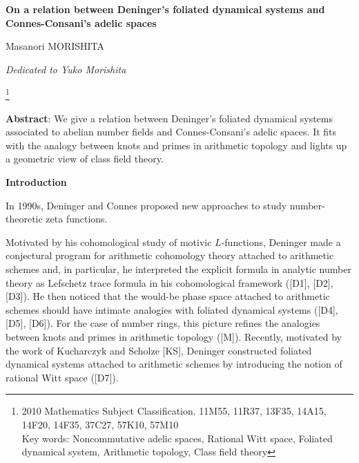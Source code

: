 \documentclass[12pt, leqno]{article}
\begin{document}
\begin{center}
 {\large \bf  On a relation between Deninger's foliated dynamical systems and  Connes-Consani's adelic spaces}
 \end{center}
 
 \vspace{0.08cm}

\begin{center}

Masanori MORISHITA

\end{center}

\begin{center}

{\it Dedicated to Yuko Morishita}

\end{center}

\vspace{0.08cm}

\footnote[0]{2010 Mathematics Subject Classification. 11M55, 11R37, 13F35, 14A15, 14F20, 14F35, 37C27, 57K10, 57M10\\
Key words: Noncommutative adelic spaces, Rational Witt space, Foliated dynamical system,  Arithmetic topology, Class field theory}

{\small {\bf Abstract}:  We give a relation between  Deninger's foliated dynamical systems associated to abelian number fields and  Connes-Consani's adelic spaces. It fits with the analogy 
between knots and primes in arithmetic topology and lights up  a geometric view of class field theory.}

\vspace{0.8cm}

\begin{center}
{\bf Introduction}
\end{center}

In 1990s, Deninger and Connes proposed new approaches to study number-theoretic zeta functions. 

Motivated by his cohomological study of motivic $L$-functions, Deninger made a conjectural program for arithmetic cohomology theory attached to arithmetic schemes and, in particular, he interpreted the explicit formula in analytic number theory as Lefschetz  trace formula in his cohomological framework ([D1], [D2], [D3]). He then noticed that the would-be phase space attached to arithmetic schemes should have intimate analogies with foliated dynamical systems ([D4], [D5], [D6]).  For the case of number rings, this picture refines the analogies between knots and primes in arithmetic topology ([M]). 
Recently, motivated by the work of Kucharczyk and Scholze [KS], Deninger constructed foliated dynamical systems attached to arithmetic schemes by introducing  the notion of rational Witt space ([D7]).   
\end{document}
